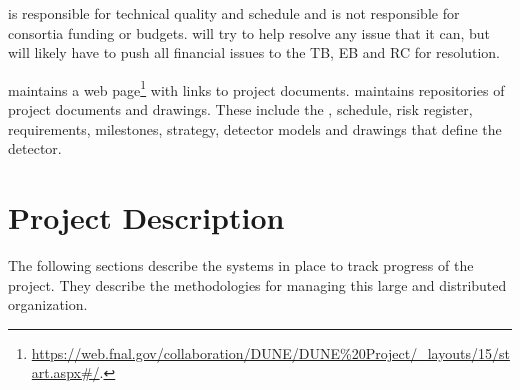  is responsible for technical quality and schedule and is not
responsible for consortia funding or budgets.   will try to help
resolve any issue that it can, but will likely have to push all
financial issues to the TB, EB and RC for resolution.

 maintains a web
page\footnote{\url{https://web.fnal.gov/collaboration/DUNE/DUNE\%20Project/\_layouts/15/start.aspx\#/}.}
with links to project documents.  maintains repositories of
project documents and drawings. These include the ,
schedule, risk register, requirements, milestones, strategy, detector
models and drawings that define the  detector.

\section{ Project Description}

The following sections describe the systems in place to track progress
of the  project. They describe the methodologies for
managing this large and distributed organization.

